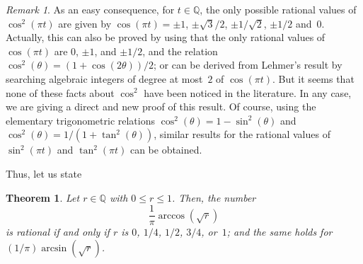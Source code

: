 \documentclass[10pt,a4paper]{article}
\newcommand{\Q}{\mathbb{Q}}
\newtheorem*{theorem}{Theorem}
\theoremstyle{remark}
\newtheorem*{rem}{Remark}
\begin{document}
\begin{rem}
As an easy consequence, for $t \in \Q$, the only possible rational values of
$\cos^2(\pi t)$ are given by $\cos(\pi t) = \pm1$, $\pm\sqrt{3}/2$,
$\pm1/\sqrt{2}$, $\pm1/2$ and~$0$.
Actually, this can also be proved by using that the only rational values of
$\cos(\pi t)$ are $0$, $\pm1$, and $\pm1/2$, and the relation
$\cos^2(\theta) = (1+\cos(2\theta))/2$;
or can be derived from Lehmer's result by searching 
algebraic integers of degree at most~$2$ of $\cos(\pi t)$.
But it seems that none of these facts about
$\cos^2$ have been noticed in the literature. In any case,
we are giving a direct and new proof of this result.
Of course, using the elementary trigonometric relations
$\cos^2(\theta) = 1-\sin^2(\theta)$
and $\cos^2(\theta) = 1/(1 +\tan^2(\theta))$,
similar results for the rational values of $\sin^2(\pi t)$ and $\tan^2(\pi t)$
can be obtained.
\end{rem}

Thus, let us state

\begin{theorem}
Let $r \in \Q$ with $0 \le r \le 1$. Then, the number
$$
  \frac{1}{\pi} \arccos\left(\sqrt{r}\right)
$$
is rational if and only if $r$ is $0$, $1/4$, $1/2$, $3/4$, or~$1$;
and the same holds for $(1/\pi) \arcsin(\sqrt{r})$.
\end{theorem}
\end{document}
